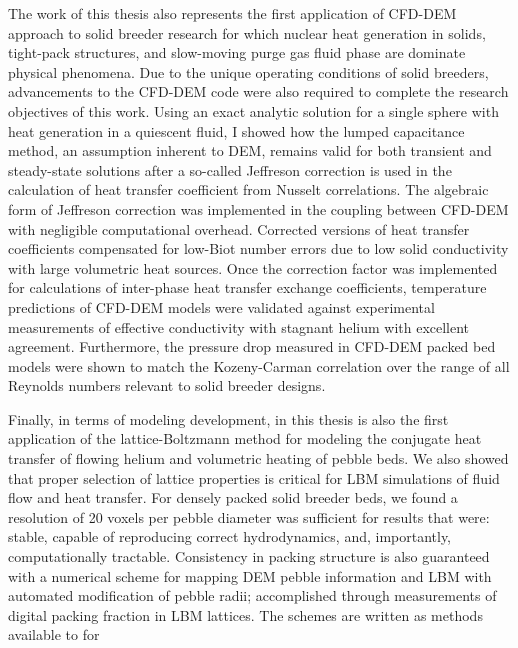The work of this thesis also represents the first application of CFD-DEM approach to solid breeder research for which nuclear heat generation in solids, tight-pack structures, and slow-moving purge gas fluid phase are dominate physical phenomena. Due to the unique operating conditions of solid breeders, advancements to the CFD-DEM code were also required to complete the research objectives of this work. Using an exact analytic solution for a single sphere with heat generation in a quiescent fluid, I showed how the lumped capacitance method, an assumption inherent to DEM, remains valid for both transient and steady-state solutions after a so-called Jeffreson correction is used in the calculation of heat transfer coefficient from Nusselt correlations. The algebraic form of Jeffreson correction was implemented in the coupling between CFD-DEM with negligible computational overhead. Corrected versions of heat transfer coefficients compensated for low-Biot number errors due to low solid conductivity with large volumetric heat sources. Once the correction factor was implemented for calculations of inter-phase heat transfer exchange coefficients, temperature predictions of CFD-DEM models were validated against experimental measurements of effective conductivity with stagnant helium with excellent agreement. Furthermore, the pressure drop measured in CFD-DEM packed bed models were shown to match the Kozeny-Carman correlation over the range of all Reynolds numbers relevant to solid breeder designs.

Finally, in terms of modeling development, in this thesis is also the first application of the lattice-Boltzmann method for modeling the conjugate heat transfer of flowing helium and volumetric heating of pebble beds. We also showed that proper selection of lattice properties is critical for LBM simulations of fluid flow and heat transfer. For densely packed solid breeder beds, we found a resolution of 20 voxels per pebble diameter was sufficient for results that were: stable, capable of reproducing correct hydrodynamics, and, importantly, computationally tractable. Consistency in packing structure is also guaranteed with a numerical scheme for mapping DEM pebble information and LBM with automated  modification of pebble radii; accomplished through measurements of digital packing fraction in LBM lattices. The schemes are written as methods available to for 

